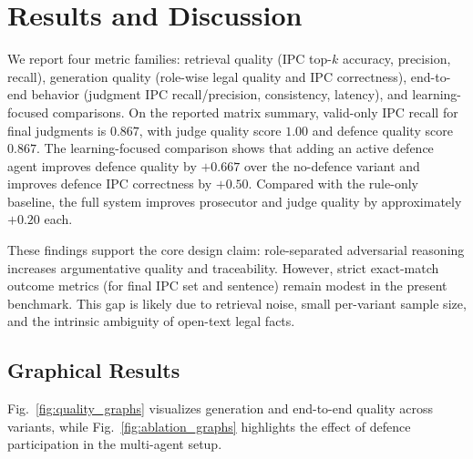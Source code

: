 \documentclass[conference]{IEEEtran}
\begin{document}
\section{Results and Discussion}
We report four metric families: retrieval quality (IPC top-$k$ accuracy, precision, recall), generation quality (role-wise legal quality and IPC correctness), end-to-end behavior (judgment IPC recall/precision, consistency, latency), and learning-focused comparisons. On the reported matrix summary, valid-only IPC recall for final judgments is $0.867$, with judge quality score $1.00$ and defence quality score $0.867$. The learning-focused comparison shows that adding an active defence agent improves defence quality by $+0.667$ over the no-defence variant and improves defence IPC correctness by $+0.50$. Compared with the rule-only baseline, the full system improves prosecutor and judge quality by approximately $+0.20$ each.

These findings support the core design claim: role-separated adversarial reasoning increases argumentative quality and traceability. However, strict exact-match outcome metrics (for final IPC set and sentence) remain modest in the present benchmark. This gap is likely due to retrieval noise, small per-variant sample size, and the intrinsic ambiguity of open-text legal facts.

\subsection{Graphical Results}
Fig.~\ref{fig:quality_graphs} visualizes generation and end-to-end quality across variants, while Fig.~\ref{fig:ablation_graphs} highlights the effect of defence participation in the multi-agent setup.
\end{document}
